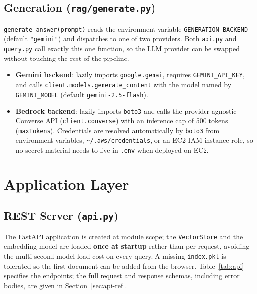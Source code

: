 \documentclass[11pt,a4paper]{article}
\newcommand{\code}[1]{\texttt{#1}}
\begin{document}
\subsection{Generation (\code{rag/generate.py})}
\code{generate\_answer(prompt)} reads the environment variable
\code{GENERATION\_BACKEND} (default \code{"gemini"}) and dispatches to one of
two providers. Both \code{api.py} and \code{query.py} call exactly this one
function, so the LLM provider can be swapped without touching the rest of the
pipeline.

\begin{itemize}
  \item \textbf{Gemini backend}: lazily imports \code{google.genai},
        requires \code{GEMINI\_API\_KEY}, and calls
        \code{client.models.generate\_content} with the model named by
        \code{GEMINI\_MODEL} (default \texttt{gemini-2.5-flash}).
  \item \textbf{Bedrock backend}: lazily imports \code{boto3} and calls the
        provider-agnostic Converse API
        (\code{client.converse}) with an inference cap of 500 tokens
        (\code{maxTokens}). Credentials are resolved automatically by
        \texttt{boto3} from environment variables, \code{\textasciitilde{}/.aws/credentials},
        or an EC2 IAM instance role, so no secret material needs to live in
        \code{.env} when deployed on EC2.
\end{itemize}

\section{Application Layer}

\subsection{REST Server (\code{api.py})}
The FastAPI application is created at module scope; the \code{VectorStore}
and the embedding model are loaded \textbf{once at startup} rather than per
request, avoiding the multi-second model-load cost on every query. A missing
\code{index.pkl} is tolerated so the first document can be added from the
browser. Table~\ref{tab:api} specifies the endpoints; the full request and
response schemas, including error bodies, are given in
Section~\ref{sec:api-ref}.
\end{document}
